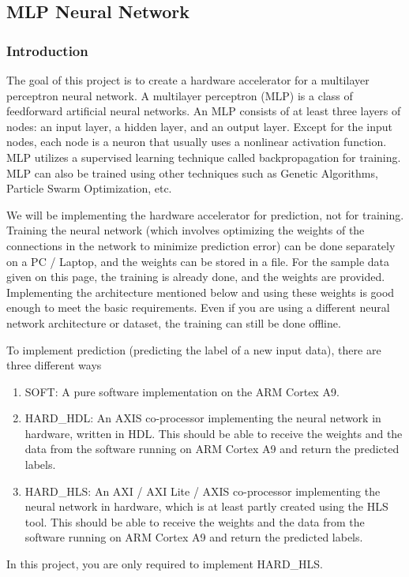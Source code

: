 \documentclass[a4paper,12pt,twoside]{article}
\begin{document}
\subsection{MLP Neural Network}
\subsubsection{Introduction}
The goal of this project is to create a hardware accelerator for a multilayer perceptron neural network. A multilayer perceptron (MLP) is a class of feedforward artificial neural networks. An MLP consists of at least three layers of nodes: an input layer, a hidden layer, and an output layer. Except for the input nodes, each node is a neuron that usually uses a nonlinear activation function. MLP utilizes a supervised learning technique called backpropagation for training. MLP can also be trained using other techniques such as Genetic Algorithms, Particle Swarm Optimization, etc.

We will be implementing the hardware accelerator for prediction, not for training. Training the neural network (which involves optimizing the weights of the connections in the network to minimize prediction error) can be done separately on a PC / Laptop, and the weights can be stored in a file. For the sample data given on this page, the training is already done, and the weights are provided. Implementing the architecture mentioned below and using these weights is good enough to meet the basic requirements. Even if you are using a different neural network architecture or dataset, the training can still be done offline.

To implement prediction (predicting the label of a new input data), there are three different ways
\begin{enumerate}
    \item SOFT: A pure software implementation on the ARM Cortex A9.
    \item HARD\_HDL: An AXIS co-processor implementing the neural network in hardware, written in HDL. This should be able to receive the weights and the data from the software running on ARM Cortex A9 and return the predicted labels.
    \item HARD\_HLS: An AXI / AXI Lite / AXIS co-processor implementing the neural network in hardware, which is at least partly created using the HLS tool. This should be able to receive the weights and the data from the software running on ARM Cortex A9 and return the predicted labels. 
\end{enumerate}
In this project, you are only required to implement HARD\_HLS.
\end{document}

